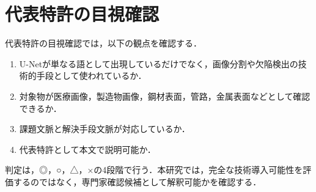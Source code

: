 \section{代表特許の目視確認}
代表特許の目視確認では，以下の観点を確認する．

\begin{enumerate}
  \item U-Netが単なる語として出現しているだけでなく，画像分割や欠陥検出の技術的手段として使われているか．
  \item 対象物が医療画像，製造物画像，鋼材表面，管路，金属表面などとして確認できるか．
  \item 課題文脈と解決手段文脈が対応しているか．
  \item 代表特許として本文で説明可能か．
\end{enumerate}

判定は，◎，○，△，×の4段階で行う．本研究では，完全な技術導入可能性を評価するのではなく，専門家確認候補として解釈可能かを確認する．
